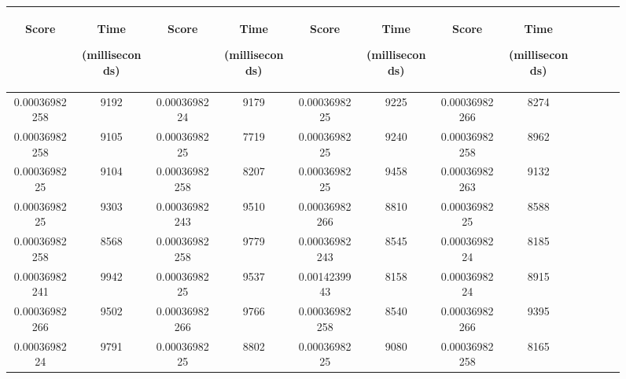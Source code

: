 \begin{figure}[h]
  \centering
  \begin{tabular}{|c|c|c|c|c|c|c|c|c|c|c|c|} 
  \midrule
 \begin{sideways}Score\end{sideways}& \begin{sideways}Time\end{sideways} \begin{sideways} (milliseconds)\end{sideways}& \begin{sideways}Score\end{sideways}& \begin{sideways}Time\end{sideways}  \begin{sideways}(milliseconds)\end{sideways}& \begin{sideways}Score\end{sideways}& \begin{sideways}Time\end{sideways}  \begin{sideways}(milliseconds)\end{sideways}& \begin{sideways}Score\end{sideways}& \begin{sideways}Time\end{sideways}  \begin{sideways} (milliseconds)\end{sideways}\\
\midrule
0.00036982258&9192&0.0003698224&9179&0.0003698225&9225&0.00036982266&8274\\
\midrule
0.00036982258&9105&0.0003698225&7719&0.0003698225&9240&0.00036982258&8962\\
\midrule
0.0003698225&9104&0.00036982258&8207&0.0003698225&9458&0.00036982263&9132\\
\midrule
0.0003698225&9303&0.00036982243&9510&0.00036982266&8810&0.0003698225&8588\\
\midrule
0.00036982258&8568&0.00036982258&9779&0.00036982243&8545&0.0003698224&8185\\
\midrule
0.00036982241&9942&0.0003698225&9537&0.0014239943&8158&0.0003698224&8915\\
\midrule
0.00036982266&9502&0.00036982266&9766&0.00036982258&8540&0.00036982266&9395\\
\midrule
0.0003698224&9791&0.0003698225&8802&0.0003698225&9080&0.00036982258&8165\\

\end{tabular}
\end{figure}
